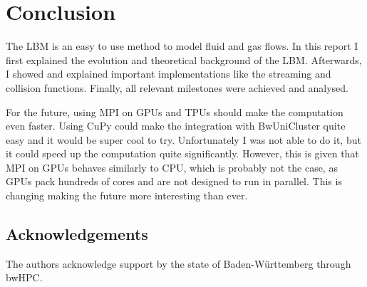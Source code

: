 \documentclass[a4paper,12pt, oneside]{book}
\begin{document}
\chapter{Conclusion}
The LBM is an easy to use method to model fluid and gas flows. In this report I first explained the evolution and theoretical background of the LBM. 
Afterwards, I showed and explained important implementations like the streaming and collision functions.
Finally, all relevant milestones were achieved and analysed.

For the future, using MPI on GPUs and TPUs should make the computation even faster.
Using CuPy could make the integration with BwUniCluster quite easy and it would be super cool to try. Unfortunately I was not able to do it, but it could speed up the computation quite significantly.
However, this is given that MPI on GPUs behaves similarly to CPU, which is probably not the case, as GPUs pack hundreds of cores and are not designed to run in parallel. 
This is changing making the future more interesting than ever.







\section{Acknowledgements}
The authors acknowledge support by the state of Baden-Württemberg through bwHPC.



\end{document}
